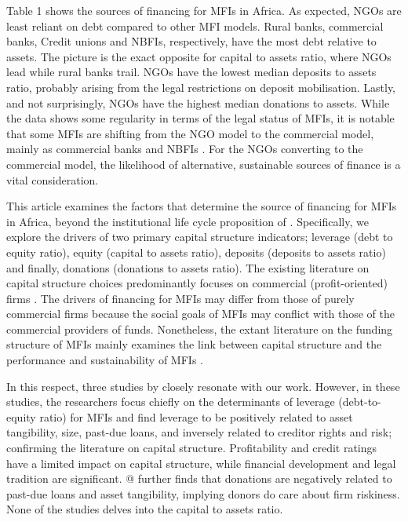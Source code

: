 \documentclass[a4paper,nobind]{templates/ociamthesis}
\begin{document}
Table 1 shows the sources of financing for MFIs in Africa. As expected, NGOs are least reliant on debt compared to other MFI models. Rural banks, commercial banks, Credit unions and NBFIs, respectively, have the most debt relative to assets. The picture is the exact opposite for capital to assets ratio, where NGOs lead while rural banks trail. NGOs have the lowest median deposits to assets ratio, probably arising from the legal restrictions on deposit mobilisation. Lastly, and not surprisingly, NGOs have the highest median donations to assets. While the data shows some regularity in terms of the legal status of MFIs, it is notable that some MFIs are shifting from the NGO model to the commercial model, mainly as commercial banks and NBFIs \autocite{sarma2011ngo,jia2016commercialization}. For the NGOs converting to the commercial model, the likelihood of alternative, sustainable sources of finance is a vital consideration.

This article examines the factors that determine the source of financing for MFIs in Africa, beyond the institutional life cycle proposition of \textcite{bayai2016financing}. Specifically, we explore the drivers of two primary capital structure indicators; leverage (debt to equity ratio), equity (capital to assets ratio), deposits (deposits to assets ratio) and finally, donations (donations to assets ratio). The existing literature on capital structure choices predominantly focuses on commercial (profit-oriented) firms \autocite{gropp2010determinants,liu2017optimal,matias2017there}. The drivers of financing for MFIs may differ from those of purely commercial firms because the social goals of MFIs may conflict with those of the commercial providers of funds. Nonetheless, the extant literature on the funding structure of MFIs mainly examines the link between capital structure and the performance and sustainability of MFIs \autocite{kyereboah2007determinants,khachatryan2017performance}.

In this respect, three studies by \autocite{kyereboah2007determinants,tchuigoua2014institutional,tchuigoua2015capital} closely resonate with our work. However, in these studies, the researchers focus chiefly on the determinants of leverage (debt-to-equity ratio) for MFIs and find leverage to be positively related to asset tangibility, size, past-due loans, and inversely related to creditor rights and risk; confirming the literature on capital structure. Profitability and credit ratings have a limited impact on capital structure, while financial development and legal tradition are significant. @\textcite{tchuigoua2014institutional} further finds that donations are negatively related to past-due loans and asset tangibility, implying donors do care about firm riskiness. None of the studies delves into the capital to assets ratio.
\end{document}
